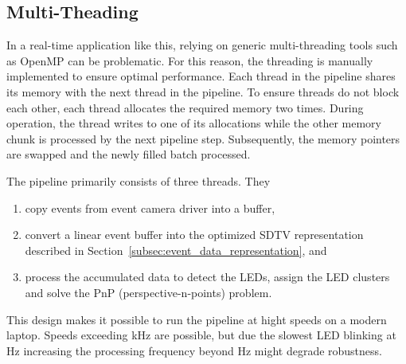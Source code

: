 \subsection{Multi-Theading}
\label{subsec:multi_threading}
In a real-time application like this, relying on generic multi-threading tools such as OpenMP can be problematic. For this reason, the threading is manually implemented to ensure optimal performance. Each thread in the pipeline shares its memory with the next thread in the pipeline. To ensure threads do not block each other, each thread allocates the required memory two times. During operation, the thread writes to one of its allocations while the other memory chunk is processed by the next pipeline step. Subsequently, the memory pointers are swapped and the newly filled batch processed. 

The pipeline primarily consists of three threads. They
\begin{enumerate}
    \item copy events from event camera driver into a buffer,
    \item convert a linear event buffer into the optimized SDTV representation described in Section~\ref{subsec:event_data_representation}, and
    \item process the accumulated data to detect the LEDs, assign the LED clusters and solve the PnP (perspective-n-points) problem.
\end{enumerate}

This design makes it possible to run the pipeline at hight speeds on a modern laptop. Speeds exceeding \unit[1]{kHz} are possible, but due the slowest LED blinking at \unit[1700]{Hz} increasing the processing frequency beyond \unit[800]{Hz} might degrade robustness.